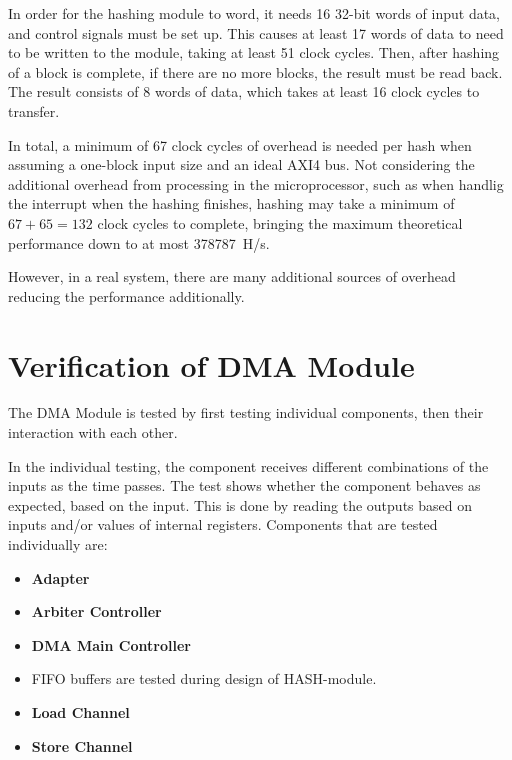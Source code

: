 In order for the hashing module to word, it needs 16 32-bit words of input data,
and control signals must be set up. This causes at least 17 words of data to
need to be written to the module, taking at least 51 clock cycles. Then, after
hashing of a block is complete, if there are no more blocks, the result must
be read back. The result consists of 8 words of data, which takes at least 16
clock cycles to transfer.

In total, a minimum of 67 clock cycles of overhead is needed per hash when assuming
a one-block input size and an ideal AXI4 bus. Not considering the additional overhead
from processing in the microprocessor, such as when handlig the interrupt when the
hashing finishes, hashing may take a minimum of $67 + 65 = 132$ clock cycles to
complete, bringing the maximum theoretical performance down to at most 378787~H/s.

However, in a real system, there are many additional sources of overhead reducing
the performance additionally.

\section{Verification of DMA Module}
The DMA Module is tested by first testing individual components, then their interaction with each other.

In the individual testing, the component receives different combinations of the inputs as the time passes.
The test shows whether the component behaves as expected, based on the input.
This is done by reading the outputs based on inputs and/or values of internal registers.
Components that are tested individually are:
\begin{itemize}
    \item \textbf{Adapter} 
    \item \textbf{Arbiter Controller}
    \item \textbf{DMA Main Controller}
    \item {} FIFO buffers are tested during design of HASH-module. 
    \item \textbf{Load Channel}
    \item \textbf{Store Channel}
\end{itemize}

